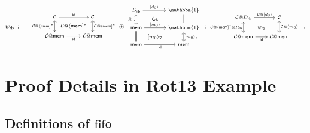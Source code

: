 \documentclass[acmsmall,screen,review,nonacm]{acmart}
\newcommand{\kw}[1]{\ensuremath{ \mathsf{#1} }}
\newcommand{\sepconj}{\oast}
\begin{document}
\[
  \psi_\kw{rb} \: := \:
{\footnotesize
  \begin{array}{c}
    \begin{tikzcd}[row sep=0.5ex, column sep=-3.5ex]
      \mathcal{C} \ar[dd, leftrightarrow, "\mathcal{C} @ \langle\kw{mem}{]}^*"']
      \ar[rr, "\kw{id}"]
       &&
      \mathcal{C} \ar[dd, leftrightarrow, "\mathcal{C} @ \langle\kw{mem}{]}^*"] \\
      & \mathcal{C} @ \langle \kw{mem} ]^* & \\
      \mathcal{C} @ \kw{mem} \ar[rr, "\kw{id}"']  && \mathcal{C} @ \kw{mem}
    \end{tikzcd}
  \end{array}
  \!\!
  \sepconj
  \!\!
  \begin{array}{c}
    \begin{tikzcd}[row sep=0ex, column sep=0.5ex]
      D_\kw{rb} \ar[dd, leftrightarrow, "R_\kw{rb}"']
      \ar[rr, "{[}d_0\rangle"] &&
      \mathbbm{1} \ar[dd, equal] \\
      & \zeta_\kw{rb} & \\
      \kw{mem}\ar[rr, "{[}m_0\rangle"]\ar[dd, equal]  && \mathbbm{1}
      \ar[dd, leftrightarrow, "{[} m_0\rangle_*"] \\
      & {[m_0 \rangle_\triangledown} & \\
      \kw{mem}\ar[rr, "\kw{id}"']  && \kw{mem}
    \end{tikzcd}
  \end{array}
  \!\! : \!\!
  \begin{array}{c}
    \begin{tikzcd}[row sep=0.5ex, column sep=0ex]
      \mathcal{C} @ D_\kw{rb} \ar[dd, leftrightarrow,
      "\mathcal{C} @ \langle\kw{mem}{]}^* \sepconj R_\kw{rb}"']
      \ar[rr, "\mathcal{C} @ {[}d_0 \rangle"]
       &&
      \mathcal{C} \ar[dd, leftrightarrow, "\mathcal{C} @ \langle m_0 \rangle"] \\
      & \psi_\kw{rb} & \\
      \mathcal{C} @ \kw{mem} \ar[rr, "\kw{id}"']  && \mathcal{C} @ \kw{mem}
    \end{tikzcd}
  \end{array}
  }
  \,.
\]


\section{Proof Details in Rot13 Example}
\label{app:proof-rot13} %

\subsection{Definitions of \kw{fifo}}
\end{document}

